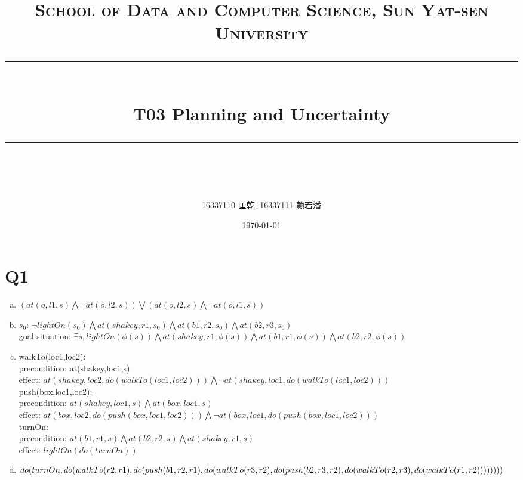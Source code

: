 \documentclass[a4paper, 11pt]{article}
\title{
\normalfont \normalsize
\textsc{School of Data and Computer Science, Sun Yat-sen University} \\ [25pt] %
\rule{\textwidth}{0.5pt} \\[0.4cm] %
\huge  T03 Planning and Uncertainty\\ %
\rule{\textwidth}{2pt} \\[0.5cm] %
\author{16337110 匡乾, 16337111 赖若潘}
\date{\normalsize\today}
}
\begin{document}
\maketitle
\tableofcontents
\newpage
\section{Q1}
\begin{enumerate}[(a)]
  \item
  $(at(o,l1,s) \bigwedge \lnot at(o,l2,s)) \bigvee(at(o,l2,s) \bigwedge \lnot at(o,l1,s))$

  \item
  $s_0$: $\lnot lightOn(s_0) \bigwedge at(shakey,r1,s_0) \bigwedge at(b1,r2,s_0) \bigwedge at(b2,r3,s_0)$\\
  goal situation: $\exists s,lightOn(\phi (s)) \bigwedge at(shakey,r1,\phi (s)) \bigwedge at(b1,r1,\phi (s)) \bigwedge at(b2,r2,\phi (s))$

  \item
walkTo(loc1,loc2):\\
	precondition: at(shakey,loc1,s)\\
	effect: $at(shakey,loc2,do(walkTo(loc1,loc2))) \bigwedge \lnot at(shakey,loc1,do(walkTo(loc1,loc2)))$\\

push(box,loc1,loc2):\\
	precondition: $at(shakey,loc1,s) \bigwedge at(box,loc1,s)$\\
	effect: $at(box,loc2,do(push(box,loc1,loc2))) \bigwedge \lnot at(box,loc1,do(push(box,loc1,loc2)))$\\

turnOn:\\
	precondition: $at(b1,r1,s) \bigwedge at(b2,r2,s) \bigwedge at(shakey,r1,s)$\\
	effect: $lightOn(do(turnOn))$

  \item
  $do(turnOn,do(walkTo(r2,r1),do(push(b1,r2,r1),do(walkTo(r3,r2),\\
  do(push(b2,r3,r2),do(walkTo(r2,r3),do(walkTo(r1,r2))))))))$
\end{enumerate}
\end{document}
